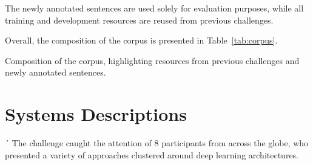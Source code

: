 \documentclass[a4paper,11pt,twocolumn,twoside]{article}
\begin{document}
The newly annotated sentences are used solely for evaluation purposes,
while all training and development resources are reused from previous challenges.

Overall, the composition of the corpus is presented in Table~\ref{tab:corpus}.

\begin{table}
  \caption{Composition of the corpus, highlighting resources from previous
  challenges and newly annotated sentences.\label{tab:corpus}}
\end{table}

\section{Systems Descriptions}\label{sec:systems}
´
The challenge caught the attention of 8 participants from across the globe,
who presented a variety of approaches clustered around deep learning architectures.
\end{document}
